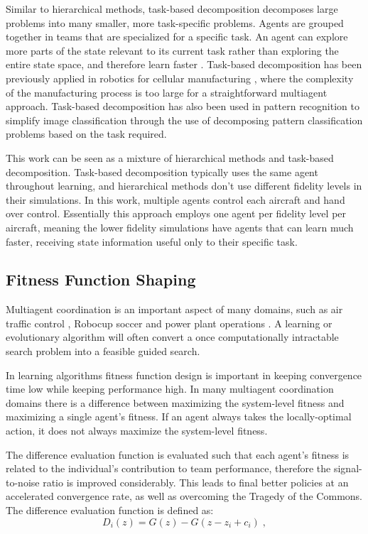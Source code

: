 \documentclass{sig-alternate}
\begin{document}
Similar to hierarchical methods, task-based decomposition decomposes large problems into many smaller, more task-specific problems. Agents are grouped together in teams that are specialized for a specific task. An agent can explore more parts of the state relevant to its current task rather than exploring the entire state space, and therefore learn faster \cite{Doucette:2012:HTD:2330163.2330178, 4708962}. Task-based decomposition has been previously applied in robotics for cellular manufacturing \cite{399902}, where the complexity of the manufacturing process is too large for a straightforward multiagent approach.  Task-based decomposition has also been used in pattern recognition \cite{788664} to simplify image classification through the use of decomposing pattern classification problems based on the task required.

This work can be seen as a mixture of hierarchical methods and task-based decomposition. Task-based decomposition typically uses the same agent throughout learning, and hierarchical methods don't use different fidelity levels in their simulations. In this work, multiple agents control each aircraft and hand over control. Essentially this approach employs one agent per fidelity level per aircraft, meaning the lower fidelity simulations have agents that can learn much faster, receiving state information useful only to their specific task.

\subsection{Fitness Function Shaping}
Multiagent coordination is an important aspect of many domains, such as air traffic control \cite{tumer-agogino_jaamas12}, Robocup soccer \cite{AAMAS12-agmon} and power plant operations \cite{Colby:2012:SFF:2343576.2343637}. A learning or evolutionary algorithm will often convert a once computationally intractable search problem into a feasible guided search. 

In learning algorithms fitness function design is important in keeping convergence time low while keeping performance high. In many multiagent coordination domains there is a difference between maximizing the system-level fitness and maximizing a single agent's fitness. If an agent always takes the locally-optimal action, it does not always maximize the system-level fitness.

The difference evaluation function \cite{tumer-agogino_jaamas12} is evaluated such that each agent's fitness is related to the individual's contribution to team performance, therefore the signal-to-noise ratio is improved considerably. This leads to final better policies at an accelerated convergence rate, as well as overcoming the Tragedy of the Commons. The difference evaluation function is defined as:
%
\begin{equation} \label{eq:DifferenceReward}
D_i(z) = G(z) - G(z - z_i + c_i)\;,
\end{equation}
\end{document}

